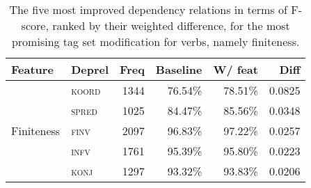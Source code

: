 \documentclass[a4paper,12pt,english]{book}
\begin{document}

\begin{table}
    \vspace{1ex}
    \centering
    \smaller[0.5]
    \begin{tabular}{@{}llrrrr@{}}
        \toprule
        \textbf{Feature} & \textbf{Deprel} & \textbf{Freq} &
        \textbf{Baseline} & \textbf{W/ feat} & \textbf{Diff} \\
        \midrule
        \multirow{5}{*}{Finiteness}
        & \textsc{koord} & 1344 & 76.54\% & 78.51\% & 0.0825 \\
        & \textsc{spred} & 1025 & 84.47\% & 85.56\% & 0.0348 \\
        & \textsc{finv} & 2097 & 96.83\% & 97.22\% & 0.0257 \\
        & \textsc{infv} & 1761 & 95.39\% & 95.80\% & 0.0223 \\
        & \textsc{konj} & 1297 & 93.32\% & 93.83\% & 0.0206 \\
        \bottomrule
    \end{tabular}
    \caption{The five most improved dependency relations in terms of F-score,
        ranked by their weighted difference, for the most promising tag set
        modification for verbs, namely finiteness.}
    \label{verbparseerror}
\end{table}
\end{document}
